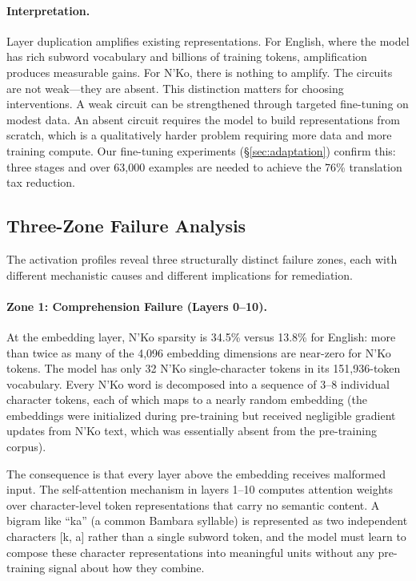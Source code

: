 \documentclass[11pt]{article}
\begin{document}
\paragraph{Interpretation.}
Layer duplication amplifies existing representations.
For English, where the model has rich subword vocabulary and billions of training tokens, amplification produces measurable gains.
For N'Ko, there is nothing to amplify.
The circuits are not weak---they are absent.
This distinction matters for choosing interventions.
A weak circuit can be strengthened through targeted fine-tuning on modest data.
An absent circuit requires the model to build representations from scratch, which is a qualitatively harder problem requiring more data and more training compute.
Our fine-tuning experiments (\S\ref{sec:adaptation}) confirm this: three stages and over 63,000 examples are needed to achieve the 76\% translation tax reduction.

\subsection{Three-Zone Failure Analysis}
\label{sec:three-zone}

The activation profiles reveal three structurally distinct failure zones, each with different mechanistic causes and different implications for remediation.

\paragraph{Zone 1: Comprehension Failure (Layers 0--10).}
At the embedding layer, N'Ko sparsity is 34.5\% versus 13.8\% for English: more than twice as many of the 4,096 embedding dimensions are near-zero for N'Ko tokens.
The model has only 32 N'Ko single-character tokens in its 151,936-token vocabulary.
Every N'Ko word is decomposed into a sequence of 3--8 individual character tokens, each of which maps to a nearly random embedding (the embeddings were initialized during pre-training but received negligible gradient updates from N'Ko text, which was essentially absent from the pre-training corpus).

The consequence is that every layer above the embedding receives malformed input.
The self-attention mechanism in layers 1--10 computes attention weights over character-level token representations that carry no semantic content.
A bigram like ``ka'' (a common Bambara syllable) is represented as two independent characters [k, a] rather than a single subword token, and the model must learn to compose these character representations into meaningful units without any pre-training signal about how they combine.
\end{document}
